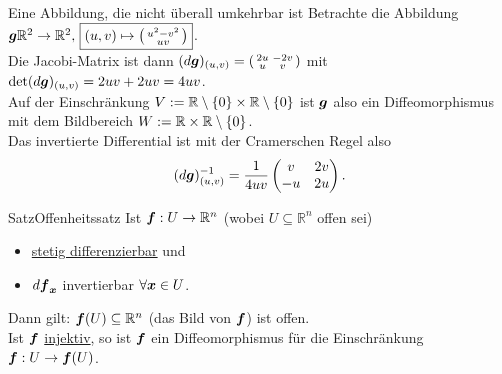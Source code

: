 \begin{Beispiel}
{Eine Abbildung{,} die nicht überall umkehrbar ist}
Betrachte die Abbildung ${{\text{\boldmath${g}$}}}\mathbb{R}^2\to\mathbb{R}^2,\,\boxed{(u,v)\mapsto\left(\begin{smallmatrix}u^2-v^2\\u v\end{smallmatrix}\right)}$.\\
Die Jacobi-Matrix ist dann $(d{{\text{\boldmath${g}$}}})_{(u,v)}=\left(\begin{smallmatrix}2u&-2v\\u&v\end{smallmatrix}\right)$ mit $\det (d{{\text{\boldmath${g}$}}})_{(u,v)}=2uv+2uv=4uv$.\\
Auf der Einschränkung $V:=\mathbb{R}\setminus\left\{0\right\}\times\mathbb{R}\setminus\left\{0\right\}$ ist ${{\text{\boldmath${g}$}}}$ also ein Diffeomorphismus mit dem Bildbereich $W:=\mathbb{R}\times\mathbb{R}\setminus\left\{0\right\}$.\\
Das invertierte Differential ist mit der Cramerschen Regel also
\begin{equation*}
    (d{{\text{\boldmath${g}$}}})^{-1}_{(u,v)}=\frac{1}{4uv}\begin{pmatrix}v&2v\\-u&2u\end{pmatrix}.
\end{equation*}
\end{Beispiel}
\begin{Satz}
{Satz}{Offenheitssatz}
Ist ${{\text{\boldmath${f}$}}}:U\to\mathbb{R}^n$ (wobei $U\subseteq\mathbb{R}^n$ offen sei) 
\begin{itemize}
    \item \underline{stetig differenzierbar} und
    \item  $d{{\text{\boldmath${f}$}}}_{{\text{\boldmath${x}$}}}$ invertierbar $\forall{{\text{\boldmath${x}$}}}\in U$.
\end{itemize}
Dann gilt:
${{\text{\boldmath${f}$}}}(U)\subseteq \mathbb{R}^n$ (das Bild von ${{\text{\boldmath${f}$}}}$) ist offen.\\
Ist ${{\text{\boldmath${f}$}}}$ \underline{injektiv}, so ist ${{\text{\boldmath${f}$}}}$ ein Diffeomorphismus für die Einschränkung ${{\text{\boldmath${f}$}}}:U\to{{\text{\boldmath${f}$}}}(U)$.
\end{Satz}


